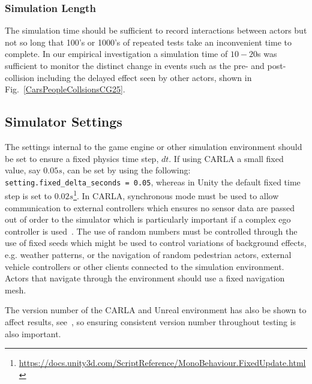\documentclass[letterpaper, 10 pt, journal, twoside]{IEEEtran}
\begin{document}


\subsubsection{Simulation Length} 
The simulation time should be sufficient to record interactions between actors but not so long that 100's or 1000's of repeated tests take an inconvenient time to complete. In our empirical investigation a simulation time of $10-20$s was sufficient to monitor the distinct change in events such as the pre- and post-collision including the delayed effect seen by other actors, shown in Fig.~\ref{CarsPeopleCollsionsCG25}.



\subsection{Simulator Settings}
The settings internal to the game engine or other simulation environment should be set to ensure a fixed physics time step, $dt$. If using CARLA a small fixed value, say $0.05s$, can be set by using the following: \texttt{setting.fixed\_delta\_seconds = 0.05}, whereas in Unity the default fixed time step is set to $0.02s$\footnote{\url{https://docs.unity3d.com/ScriptReference/MonoBehaviour.FixedUpdate.html}}. In CARLA, synchronous mode must be used to allow communication to external controllers which ensures no sensor data are passed out of order to the simulator which is particularly important if a complex ego controller is used~\cite{carla_sim_config}. 
%
The use of random numbers must be controlled through the use of fixed seeds which might be used to control variations of background effects, e.g. weather patterns, or the navigation of random pedestrian actors, external vehicle controllers or other clients connected to the simulation environment. 
%
Actors that navigate through the environment should use a fixed navigation mesh.

The version number of the CARLA and Unreal environment has also be shown to affect results, see~\cite{TSLUnrealEngineTesting}, so ensuring consistent version number throughout testing is also important.
\end{document}
